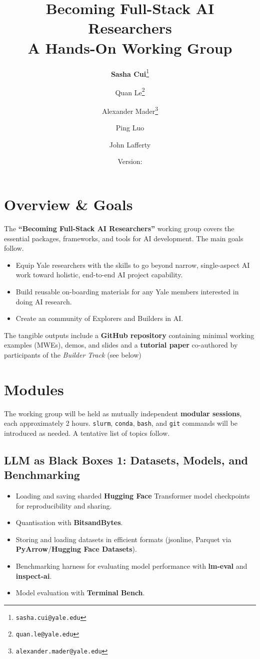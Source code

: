 \documentclass[12pt]{article}
\title{\textbf{Becoming Full-Stack AI Researchers} \\ \vspace{0.5em} \large A Hands-On Working Group}
\author[1]{\textbf{Sasha Cui}\footnote{\texttt{sasha.cui@yale.edu}}}
\author[1]{{Quan Le}\footnote{\texttt{quan.le@yale.edu}}}
\author[2]{{Alexander Mader}\footnote{\texttt{alexander.mader@yale.edu}}}
\author[3]{Ping Luo}
\author[4]{John Lafferty}
\affil[1]{Department of Statistics \& Data Science\\Yale University}
\affil[2]{Department of Physics\\Yale University}
\affil[3]{Wu Tsai Institute\\Yale University}
\affil[4]{Department of Statistics \& Data Science\\Yale University}
\date{Version: \ttt{\today}}
\begin{document}
 \maketitle

\section{Overview \& Goals}
The \textbf{``Becoming Full-Stack AI Researchers''} working group covers the essential packages, frameworks, and tools for AI development.  The main goals follow.
\begin{itemize}
    \item Equip Yale researchers with the skills to go beyond narrow, single-aspect AI work toward holistic, end-to-end AI project capability.
    \item Build reusable on-boarding materials for any Yale members interested in doing AI research.
    \item Create an community of Explorers and Builders in AI.
\end{itemize}
The tangible outputs include a \textbf{GitHub repository} containing minimal working examples (MWEs), demos, and slides and a \textbf{tutorial paper} co-authored by participants of the \emph{Builder Track} (see below)

\section{Modules}
The working group will be held as mutually independent \textbf{modular sessions}, each approximately 2 hours.  \texttt{slurm}, \texttt{conda}, \texttt{bash}, and \texttt{git} commands will be introduced as needed.  A tentative list of topics follow. 
\subsection{LLM as Black Boxes 1: Datasets, Models, and Benchmarking}
\begin{itemize}
    \item Loading and saving sharded \textbf{Hugging Face} Transformer model checkpoints for reproducibility and sharing.
    \item Quantisation with \textbf{BitsandBytes}.
    \item Storing and loading datasets in efficient formats (jsonline, Parquet via \textbf{PyArrow}/\textbf{Hugging Face Datasets}).
    \item Benchmarking harness for evaluating model performance with \textbf{lm-eval} and \textbf{inspect-ai}.
    \item Model evaluation with \textbf{Terminal Bench}.
\end{itemize}
\end{document}
